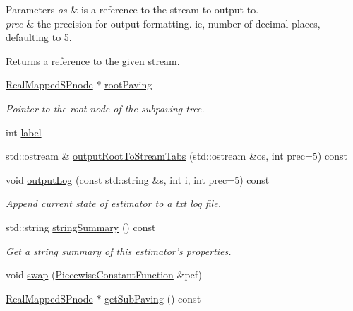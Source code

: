 \begin{DoxyParams}{\-Parameters}
{\em os} & is a reference to the stream to output to. \\
\hline
{\em prec} & the precision for output formatting. ie, number of decimal places, defaulting to 5. \\
\hline
\end{DoxyParams}
\begin{DoxyReturn}{\-Returns}
a reference to the given stream. 
\end{DoxyReturn}
\begin{DoxyCompactItemize}
\item 
\hyperlink{classsubpavings_1_1RealMappedSPnode}{\-Real\-Mapped\-S\-Pnode} $\ast$ \hyperlink{classsubpavings_1_1PiecewiseConstantFunction_aef23daaf4b73237b67ed40985b3038a3}{root\-Paving}
\begin{DoxyCompactList}\small\item\em \-Pointer to the root node of the subpaving tree. \end{DoxyCompactList}\item 
int \hyperlink{classsubpavings_1_1PiecewiseConstantFunction_a622a9d3b705f1c81cd7a5a7b95e8d4c8}{label}
\item 
std\-::ostream \& \hyperlink{classsubpavings_1_1PiecewiseConstantFunction_a94a4166cf5d3a009021be8b43e41f9ed}{output\-Root\-To\-Stream\-Tabs} (std\-::ostream \&os, int prec=5) const 
\item 
void \hyperlink{classsubpavings_1_1PiecewiseConstantFunction_a411e285d0cc7c8de1f6ac29706ddb2d4}{output\-Log} (const std\-::string \&s, int i, int prec=5) const 
\begin{DoxyCompactList}\small\item\em \-Append current state of estimator to a txt log file. \end{DoxyCompactList}\item 
std\-::string \hyperlink{classsubpavings_1_1PiecewiseConstantFunction_abb23fd1b7e0dc5ee81c976c23c1452a0}{string\-Summary} () const 
\begin{DoxyCompactList}\small\item\em \-Get a string summary of this estimator's properties. \end{DoxyCompactList}\item 
void \hyperlink{classsubpavings_1_1PiecewiseConstantFunction_a5b106e9526613ce2a0f81bd4e303b6cf}{swap} (\hyperlink{classsubpavings_1_1PiecewiseConstantFunction}{\-Piecewise\-Constant\-Function} \&pcf)
\item 
\hyperlink{classsubpavings_1_1RealMappedSPnode}{\-Real\-Mapped\-S\-Pnode} $\ast$ \hyperlink{classsubpavings_1_1PiecewiseConstantFunction_a88d23ec0f66eef3215b2081cec17815c}{get\-Sub\-Paving} () const 

\end{DoxyCompactItemize}
